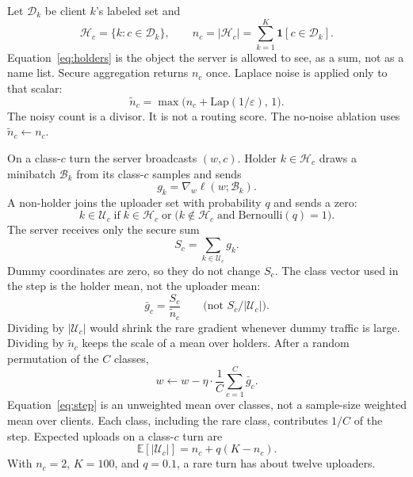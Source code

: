 \documentclass[11pt,a4paper]{article}
\theoremstyle{plain}
\begin{document}
Let $\mathcal{D}_k$ be client $k$'s labeled set and
\begin{equation}
\mathcal{H}_c = \{k : c \in \mathcal{D}_k\}, \qquad
n_c = |\mathcal{H}_c| = \sum_{k=1}^{K} \mathbf{1}[c \in \mathcal{D}_k].
\label{eq:holders}
\end{equation}
Equation~\eqref{eq:holders} is the object the server is allowed to see, as a sum, not as a name list. Secure aggregation returns $n_c$ once. Laplace noise is applied only to that scalar:
\begin{equation}
\tilde n_c = \max\bigl(n_c + \mathrm{Lap}(1/\varepsilon),\, 1\bigr).
\label{eq:noisy-n}
\end{equation}
The noisy count is a divisor. It is not a routing score. The no-noise ablation uses $\tilde n_c \leftarrow n_c$.

On a class-$c$ turn the server broadcasts $(w,c)$. Holder $k\in\mathcal{H}_c$ draws a minibatch $\mathcal{B}_k$ from its class-$c$ samples and sends
\begin{equation}
g_k = \nabla_w \ell(w;\mathcal{B}_k).
\label{eq:local-grad}
\end{equation}
A non-holder joins the uploader set with probability $q$ and sends a zero:
\begin{equation}
k \in \mathcal{U}_c \;\text{if}\;
k\in\mathcal{H}_c
\;\text{or}\;
\bigl(k\notin\mathcal{H}_c \;\text{and}\; \mathrm{Bernoulli}(q)=1\bigr).
\label{eq:uploaders}
\end{equation}
The server receives only the secure sum
\begin{equation}
S_c = \sum_{k \in \mathcal{U}_c} g_k.
\label{eq:secagg}
\end{equation}
Dummy coordinates are zero, so they do not change $S_c$. The class vector used in the step is the holder mean, not the uploader mean:
\begin{equation}
\bar g_c = \frac{S_c}{\tilde n_c}
\qquad\text{(not $S_c/|\mathcal{U}_c|$)}.
\label{eq:class-mean}
\end{equation}
Dividing by $|\mathcal{U}_c|$ would shrink the rare gradient whenever dummy traffic is large. Dividing by $\tilde n_c$ keeps the scale of a mean over holders. After a random permutation of the $C$ classes,
\begin{equation}
w \leftarrow w - \eta \cdot \frac{1}{C}\sum_{c=1}^{C} \bar g_c.
\label{eq:step}
\end{equation}
Equation~\eqref{eq:step} is an unweighted mean over classes, not a sample-size weighted mean over clients. Each class, including the rare class, contributes $1/C$ of the step. Expected uploads on a class-$c$ turn are
\begin{equation}
\mathbb{E}[|\mathcal{U}_c|] = n_c + q(K-n_c).
\label{eq:comm}
\end{equation}
With $n_c=2$, $K=100$, and $q=0.1$, a rare turn has about twelve uploaders.
\end{document}
